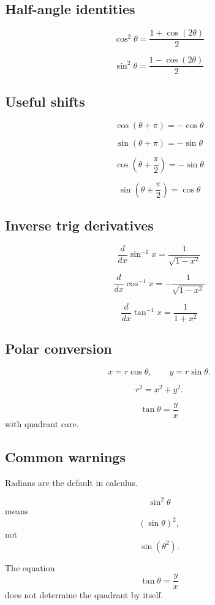 \subsection*{Half-angle identities}

\[
\boxed{
    \cos^2\theta=\frac{1+\cos(2\theta)}{2}
}
\]

\[
\boxed{
    \sin^2\theta=\frac{1-\cos(2\theta)}{2}
}
\]

\subsection*{Useful shifts}

\[
\boxed{
    \cos(\theta+\pi)=-\cos\theta
}
\]

\[
\boxed{
    \sin(\theta+\pi)=-\sin\theta
}
\]

\[
\boxed{
    \cos\left(\theta+\frac{\pi}{2}\right)=-\sin\theta
}
\]

\[
\boxed{
    \sin\left(\theta+\frac{\pi}{2}\right)=\cos\theta
}
\]

\subsection*{Inverse trig derivatives}

\[
\boxed{
    \frac{d}{dx}\sin^{-1}x=\frac1{\sqrt{1-x^2}}
}
\]

\[
\boxed{
    \frac{d}{dx}\cos^{-1}x=-\frac1{\sqrt{1-x^2}}
}
\]

\[
\boxed{
    \frac{d}{dx}\tan^{-1}x=\frac1{1+x^2}
}
\]

\subsection*{Polar conversion}

\[
\boxed{
    x=r\cos\theta,
    \qquad
    y=r\sin\theta.
}
\]

\[
\boxed{
    r^2=x^2+y^2.
}
\]

\[
\boxed{
    \tan\theta=\frac yx
}
\]
with quadrant care.

\subsection*{Common warnings}

Radians are the default in calculus.

\[
    \sin^2\theta
\]
means
\[
    (\sin\theta)^2,
\]
not
\[
    \sin(\theta^2).
\]

The equation
\[
    \tan\theta=\frac yx
\]
does not determine the quadrant by itself.

